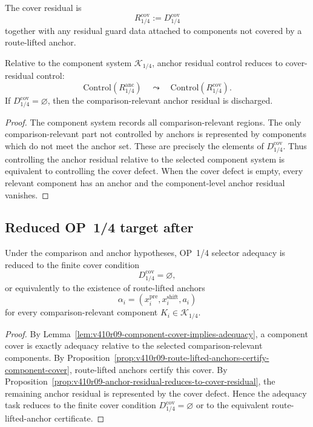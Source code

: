 \begin{definition}
\label{def:v410r09-cover-residual}
The cover residual is
\[
 R_{1/4}^{\mathrm{cov}}
 :=
 D_{1/4}^{\mathrm{cov}}
\]
together with any residual guard data attached to components not covered by a
route-lifted anchor.
\end{definition}

\begin{proposition}
\label{prop:v410r09-anchor-residual-reduces-to-cover-residual}
Relative to the component system \(\mathcal K_{1/4}\), anchor residual control
reduces to cover-residual control:
\[
 \mathrm{Control}(R_{1/4}^{\mathrm{anc}})
 \quad\leadsto\quad
 \mathrm{Control}(R_{1/4}^{\mathrm{cov}}).
\]
If \(D_{1/4}^{\mathrm{cov}}=\varnothing\), then the comparison-relevant anchor
residual is discharged.
\end{proposition}

\begin{proof}
The component system records all comparison-relevant regions. The only
comparison-relevant part not controlled by anchors is represented by components
which do not meet the anchor set. These are precisely the elements of
\(D_{1/4}^{\mathrm{cov}}\). Thus controlling the anchor residual relative to
the selected component system is equivalent to controlling the cover defect.
When the cover defect is empty, every relevant component has an anchor and the
component-level anchor residual vanishes.
\end{proof}

\subsection{Reduced OP~1/4 target after}
\label{subsec:v410r09-reduced-op14-target-after-r09}

\begin{theorem}
\label{thm:v410r09-op14-adequacy-reduction-to-finite-cover}
Under the comparison and anchor hypotheses, OP~1/4 selector adequacy is
reduced to the finite cover condition
\[
 D_{1/4}^{\mathrm{cov}}=\varnothing,
\]
or equivalently to the existence of route-lifted anchors
\[
 \alpha_i=(x_i^{\mathrm{pre}},x_i^{\mathrm{shift}},a_i)
\]
for every comparison-relevant component \(K_i\in\mathcal K_{1/4}\).
\end{theorem}

\begin{proof}
By Lemma~\ref{lem:v410r09-component-cover-implies-adequacy}, a component cover
is exactly adequacy relative to the selected comparison-relevant components.
By Proposition~\ref{prop:v410r09-route-lifted-anchors-certify-component-cover},
route-lifted anchors certify this cover. By
Proposition~\ref{prop:v410r09-anchor-residual-reduces-to-cover-residual}, the
remaining anchor residual is represented by the cover defect. Hence the
adequacy task reduces to the finite cover condition \(D_{1/4}^{\mathrm{cov}}=\varnothing\)
or to the equivalent route-lifted-anchor certificate.
\end{proof}

